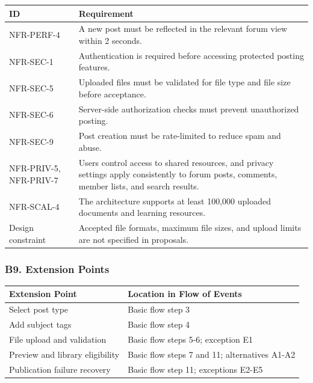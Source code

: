 \documentclass[12pt]{article}
\renewcommand{\baselinestretch}{1.5}
\begin{document}
\begingroup
\small
\renewcommand{\baselinestretch}{1.0}\selectfont
\renewcommand{\arraystretch}{1.15}
\setlength{\tabcolsep}{6pt}
\begin{longtable}{|>{\raggedright\arraybackslash}p{}|>{\raggedright\arraybackslash}p{}|}
\hline
\textbf{ID} & \textbf{Requirement} \\ \hline
\endhead
NFR-PERF-4 & A new post must be reflected in the relevant forum view within 2 seconds. \\ \hline
NFR-SEC-1 & Authentication is required before accessing protected posting features. \\ \hline
NFR-SEC-5 & Uploaded files must be validated for file type and file size before acceptance. \\ \hline
NFR-SEC-6 & Server-side authorization checks must prevent unauthorized posting. \\ \hline
NFR-SEC-9 & Post creation must be rate-limited to reduce spam and abuse. \\ \hline
NFR-PRIV-5, NFR-PRIV-7 & Users control access to shared resources, and privacy settings apply consistently to forum posts, comments, member lists, and search results. \\ \hline
NFR-SCAL-4 & The architecture supports at least 100,000 uploaded documents and learning resources. \\ \hline
Design constraint & Accepted file formats, maximum file sizes, and upload limits are not specified in proposals. \\ \hline
\end{longtable}
\endgroup
\par\medskip

\hypertarget{sec:b9-extension-points}{}
\subsubsection*{B9. Extension Points}
\par\medskip

\begingroup
\small
\renewcommand{\baselinestretch}{1.0}\selectfont
\renewcommand{\arraystretch}{1.15}
\setlength{\tabcolsep}{6pt}
\begin{longtable}{|>{\raggedright\arraybackslash}p{}|>{\raggedright\arraybackslash}p{}|}
\hline
\textbf{Extension Point} & \textbf{Location in Flow of Events} \\ \hline
\endhead
Select post type & Basic flow step 3 \\ \hline
Add subject tags & Basic flow step 4 \\ \hline
File upload and validation & Basic flow steps 5-6; exception E1 \\ \hline
Preview and library eligibility & Basic flow steps 7 and 11; alternatives A1-A2 \\ \hline
Publication failure recovery & Basic flow step 11; exceptions E2-E5 \\ \hline
\end{longtable}
\endgroup
\par\medskip
\end{document}
